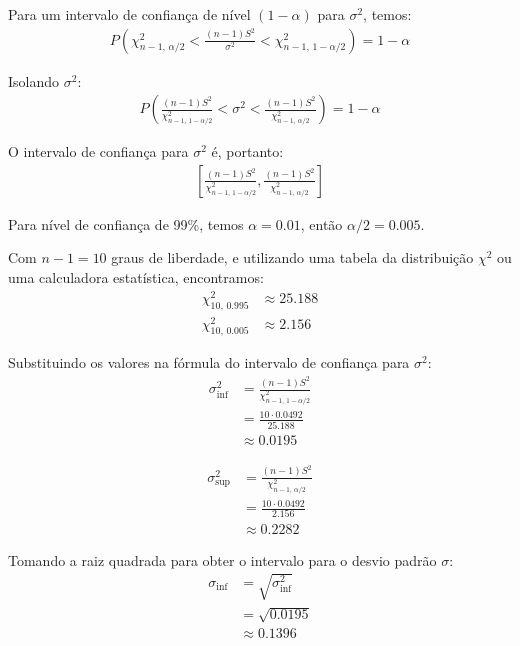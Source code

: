 \documentclass[a4paper,12pt]{article}
\begin{document}
\begin{enumerate}
\begin{mdframed}[backgroundcolor=gray!10, linewidth=0pt, innertopmargin=10pt, innerbottommargin=10pt]
    Para um intervalo de confiança de nível $(1-\alpha)$ para $\sigma^2$, temos:
    \begin{align*}
    P\left(\chi^2_{n-1,\,\alpha/2} < \frac{(n-1)S^2}{\sigma^2} < \chi^2_{n-1,\,1-\alpha/2}\right) = 1-\alpha
    \end{align*}

    Isolando $\sigma^2$:
    \begin{align*}
    P\left(\frac{(n-1)S^2}{\chi^2_{n-1,\,1-\alpha/2}} < \sigma^2 < \frac{(n-1)S^2}{\chi^2_{n-1,\,\alpha/2}}\right) = 1-\alpha
    \end{align*}

    O intervalo de confiança para $\sigma^2$ é, portanto:
    \begin{align*}
    \left[\frac{(n-1)S^2}{\chi^2_{n-1,\,1-\alpha/2}}, \frac{(n-1)S^2}{\chi^2_{n-1,\,\alpha/2}}\right]
    \end{align*}

    Para nível de confiança de 99\%, temos $\alpha = 0.01$, então $\alpha/2 = 0.005$.
    
    Com $n-1 = 10$ graus de liberdade, e utilizando uma tabela da distribuição $\chi^2$ ou uma calculadora estatística, encontramos:
    \begin{align*}
    \chi^2_{10,\,0.995} &\approx 25.188 \\
    \chi^2_{10,\,0.005} &\approx 2.156
    \end{align*}

    Substituindo os valores na fórmula do intervalo de confiança para $\sigma^2$:
    \begin{align*}
    \sigma^2_{\text{inf}} &= \frac{(n-1)S^2}{\chi^2_{n-1,\,1-\alpha/2}} \\
    &= \frac{10 \cdot 0.0492}{25.188} \\
    &\approx 0.0195
    \end{align*}

    \begin{align*}
    \sigma^2_{\text{sup}} &= \frac{(n-1)S^2}{\chi^2_{n-1,\,\alpha/2}} \\
    &= \frac{10 \cdot 0.0492}{2.156} \\
    &\approx 0.2282
    \end{align*}

    Tomando a raiz quadrada para obter o intervalo para o desvio padrão $\sigma$:
    \begin{align*}
    \sigma_{\text{inf}} &= \sqrt{\sigma^2_{\text{inf}}} \\
    &= \sqrt{0.0195} \\
    &\approx 0.1396
    \end{align*}


\end{mdframed}
\end{enumerate}
\end{document}
